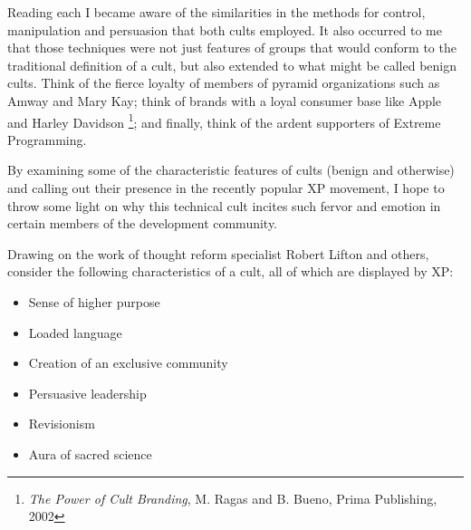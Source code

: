 \documentclass{article}
\begin{document}
Reading each I became aware of the similarities in the methods for
control, manipulation and persuasion that both cults employed. It also
occurred to me that those techniques were not just features of groups
that would conform to the traditional definition of a cult, but also
extended to what might be called benign cults. Think of the fierce
loyalty of members of pyramid organizations such as Amway and Mary Kay;
think of brands with a loyal consumer base like Apple and Harley
Davidson \footnote{\emph{The Power of Cult Branding}, M. Ragas and B. Bueno, Prima
Publishing, 2002}; and finally, think of the ardent supporters of Extreme
Programming.

By examining some of the characteristic features of cults (benign and
otherwise) and calling out their presence in the recently popular XP
movement, I hope to throw some light on why this technical cult incites
such fervor and emotion in certain members of the development community.

Drawing on the work of thought reform specialist Robert Lifton and
others, consider the following characteristics of a cult, all of which
are displayed by XP:

\begin{itemize}
\item Sense of higher purpose
\item Loaded language
\item Creation of an exclusive community
\item Persuasive leadership
\item Revisionism
\item Aura of sacred science
\end{itemize}
\end{document}
